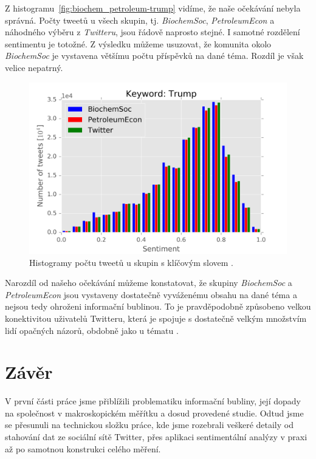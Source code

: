 \documentclass[12pt, a4paper]{article}
\numberwithin{equation}{section} 	%
\begin{document}
Z histogramu~\autoref{fig:biochem_petroleum-trump} vidíme, že naše očekávání nebyla správná. Počty tweetů u všech skupin, tj. \textit{BiochemSoc}, \textit{PetroleumEcon} a náhodného výběru z \textit{Twitteru}, jsou řádově naprosto stejné. I samotné rozdělení sentimentu je totožné. Z výsledku můžeme usuzovat, že komunita okolo \textit{BiochemSoc} je vystavena většímu počtu příspěvků na dané téma. Rozdíl je však velice nepatrný.
\begin{figure}[h]
\centering
\includegraphics[scale=0.5]{./Pics/biochem_petroleum-trump.png}
\caption{Histogramy počtu tweetů u skupin s klíčovým slovem \textit{}.}
\label{fig:biochem_petroleum-trump}
\end{figure}

Narozdíl od našeho očekávání můžeme konstatovat, že skupiny \textit{BiochemSoc} a \textit{PetroleumEcon} jsou vystaveny dostatečně vyváženému obsahu na dané téma a nejsou tedy ohroženi informační bublinou. To je pravděpodobně způsobeno velkou konektivitou uživatelů Twitteru, která je spojuje s dostatečně velkým množstvím lidí opačných názorů, obdobně jako u tématu \textit{}.







\newpage
\section{Závěr}
\noindent V první části práce jsme přiblížili problematiku informační bubliny, její dopady na společnost v makroskopickém měřítku a dosud provedené studie.  Odtud jsme se přesunuli na technickou složku práce, kde jsme rozebrali veškeré detaily od stahování dat ze sociální sítě Twitter, přes aplikaci sentimentální analýzy v praxi až po samotnou konstrukci celého měření.
\end{document}

